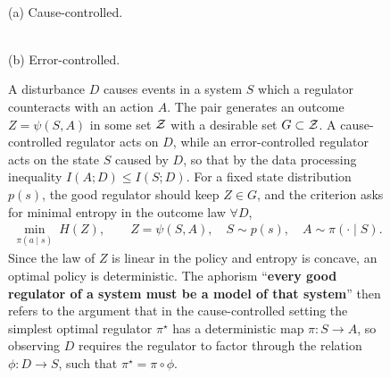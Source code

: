 \begin{figure}[t]
\label{fig:oneshot}
\begin{tcolorbox}[colback=gray!4, colframe=gray!60, boxrule=0.5pt, arc=2pt, left=4pt, right=4pt, top=3pt, bottom=3pt, title={Figure~\thefigure: The good regulator from \citet{Conant-good70} in a nutshell.}, fonttitle=\small\bfseries, coltitle=black, colbacktitle=gray!15]
\begin{minipage}[c]{0.3\linewidth}
\centering
{}\\
{\small (a) Cause-controlled.}\\[8mm]
\\
{\small (b) Error-controlled.}
\end{minipage}\hfill
\begin{minipage}[c]{0.67\linewidth}
\small
A disturbance $D$ causes events in a system $S$ which a regulator counteracts with an action $A$.
The pair generates an outcome $Z = \psi(S,A)$ in some set $\mathcal Z$ with a desirable set $G \subset \mathcal Z$.
A cause-controlled regulator acts on $D$, while an error-controlled regulator acts on the state $S$ caused by $D$, so that by the data processing inequality $I(A;D) \le I(S;D)$.
For a fixed state distribution $p(s)$, the good regulator should keep $Z \in G$, and the criterion asks for minimal entropy in the outcome law $\forall D$,
{\setlength{\abovedisplayskip}{4pt}\setlength{\belowdisplayskip}{3pt}
\begin{align*}
    \min_{\pi(a \mid s)}\ H(Z), \qquad Z = \psi(S,A), \quad S \sim p(s), \quad A \sim \pi(\cdot \mid S).
\end{align*}}
Since the law of $Z$ is linear in the policy and entropy is concave, an optimal policy is deterministic.
The aphorism ``\textbf{every good regulator of a system must be a model of that system}'' then refers to the argument that in the cause-controlled setting the simplest optimal regulator $\pi^\star$ has a deterministic map $\pi\colon S \to A$, so observing $D$ requires the regulator to factor through the relation $\phi\colon D \to S$, such that $\pi^\star = \pi \circ \phi$.
\end{minipage}
\end{tcolorbox}
\end{figure}


